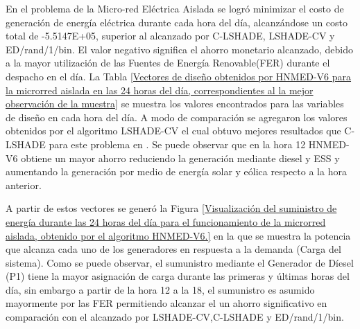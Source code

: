 En el problema de la Micro-red Eléctrica Aislada se logró minimizar el costo de generación de energía eléctrica durante cada hora del día, alcanzándose un costo total de -5.5147E+05, superior al alcanzado por C-LSHADE, LSHADE-CV y ED/rand/1/bin. El valor negativo significa el ahorro monetario alcanzado, debido a la mayor utilización de las Fuentes de Energía Renovable(FER) durante el despacho en el día.
La Tabla \ref{Vectores de diseño obtenidos por HNMED-V6 para la microrred aislada en las 24 horas del día, correspondientes al la mejor observación de la muestra} se muestra los valores encontrados para las variables de
diseño en cada hora del día. A modo de comparación se agregaron los valores obtenidos por el algoritmo LSHADE-CV el cual obtuvo mejores resultados que C-LSHADE para este problema en \cite{zapata_zapata_control_2017}. Se puede observar que en la hora 12 HNMED-V6 obtiene un mayor ahorro reduciendo la generación mediante diesel y ESS y aumentando la generación por medio de energía solar y eólica respecto a la hora anterior. 

A partir de estos vectores se generó la Figura \ref{Visualización del suministro de energía durante las 24 horas del día para el funcionamiento de la microrred aislada, obtenido por el algoritmo HNMED-V6.} en la que se muestra la potencia que alcanza cada uno de los generadores en respuesta a la demanda (Carga del sistema). Como se puede observar, el sumunistro mediante el Generador de Díesel (P1) tiene la mayor asignación de carga durante las primeras  y últimas horas del día, sin embargo a partir de la hora 12 a la 18, el sumunistro es asumido mayormente por las FER permitiendo alcanzar el un ahorro significativo en comparación con el alcanzado por LSHADE-CV,C-LSHADE y ED/rand/1/bin.

